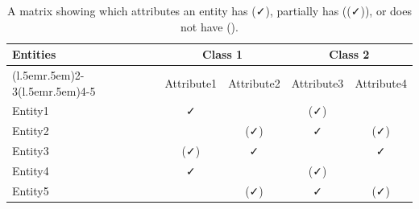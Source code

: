 \begin{table}[tb]
  \newcommand{\checkYes}{\faCheck}%
  \newcommand{\checkPartially}{{\color{gray}(\faCheck)}}
  \newcommand{\checkNo}{\faTimes}
  \caption{A matrix showing which attributes an entity has (\checkYes), partially has (\checkPartially), or does not have (\checkNo).}
  \label{table-with-checkmarks}
  \centering\small
  \begin{tabular}{@{}l@{\hspace{3\tabcolsep}}cccc@{}} %
    \toprule
    \bfseries Entities & \multicolumn{2}{c}{\bfseries Class 1} & \multicolumn{2}{c}{\bfseries Class 2}                                     \\
    \cmidrule(l{.5em}r{.5em}){2-3}\cmidrule(l{.5em}r{.5em}){4-5}
                       & Attribute1                            & Attribute2                            & Attribute3      & Attribute4      \\
    \midrule
    Entity1            & \checkYes                             & \checkNo                              & \checkPartially & \checkNo        \\
    Entity2            & \checkNo                              & \checkPartially                       & \checkYes       & \checkPartially \\
    Entity3            & \checkPartially                       & \checkYes                             & \checkNo        & \checkYes       \\
    Entity4            & \checkYes                             & \checkNo                              & \checkPartially & \checkNo        \\
    Entity5            & \checkNo                              & \checkPartially                       & \checkYes       & \checkPartially \\
    \bottomrule
  \end{tabular}
\end{table}

